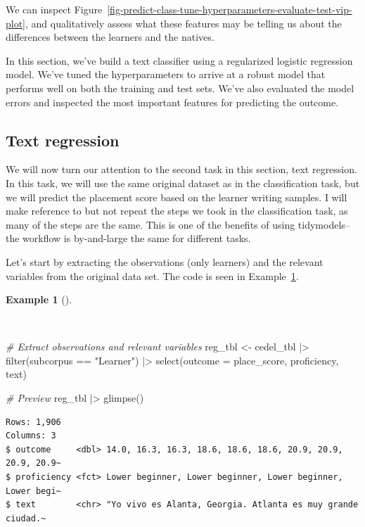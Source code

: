 \documentclass[
  letterpaper,
  krantz1]{latex/krantz-mod}
\newenvironment{Shaded}{\begin{snugshade}}{\end{snugshade}}
\newcommand{\AttributeTok}[1]{\textcolor[rgb]{0.00,0.00,0.00}{#1}}
\newcommand{\CommentTok}[1]{\textcolor[rgb]{0.00,0.00,0.00}{\textit{#1}}}
\newcommand{\FunctionTok}[1]{\textcolor[rgb]{0.00,0.00,0.00}{#1}}
\newcommand{\NormalTok}[1]{\textcolor[rgb]{0.00,0.00,0.00}{#1}}
\newcommand{\OtherTok}[1]{\textcolor[rgb]{0.00,0.00,0.00}{#1}}
\newcommand{\SpecialCharTok}[1]{\textcolor[rgb]{0.00,0.00,0.00}{#1}}
\newcommand{\StringTok}[1]{\textcolor[rgb]{0.00,0.00,0.00}{#1}}
\theoremstyle{definition}
\newtheorem{example}{Example}[chapter]
\theoremstyle{definition}
\theoremstyle{remark}
\begin{document}
We can inspect
Figure~\ref{fig-predict-class-tune-hyperparameters-evaluate-test-vip-plot},
and qualitatively assess what these features may be telling us about the
differences between the learners and the natives.

In this section, we've build a text classifier using a regularized
logistic regression model. We've tuned the hyperparameters to arrive at
a robust model that performs well on both the training and test sets.
We've also evaluated the model errors and inspected the most important
features for predicting the outcome.

\subsection{Text regression}\label{sec-predict-text-regression}

We will now turn our attention to the second task in this section, text
regression. In this task, we will use the same original dataset as in
the classification task, but we will predict the placement score based
on the learner writing samples. I will make reference to but not repeat
the steps we took in the classification task, as many of the steps are
the same. This is one of the benefits of using tidymodels--the workflow
is by-and-large the same for different tasks.

Let's start by extracting the observations (only learners) and the
relevant variables from the original data set. The code is seen in
Example~\ref{exm-predict-reg-data}.

\begin{example}[]\protect\hypertarget{exm-predict-reg-data}{}\label{exm-predict-reg-data}

~

\begin{Shaded}
\begin{Highlighting}[numbers=left,,]
\CommentTok{\# Extract observations and relevant variables}
\NormalTok{reg\_tbl }\OtherTok{\textless{}{-}}
\NormalTok{  cedel\_tbl }\SpecialCharTok{|\textgreater{}}
  \FunctionTok{filter}\NormalTok{(subcorpus }\SpecialCharTok{==} \StringTok{"Learner"}\NormalTok{) }\SpecialCharTok{|\textgreater{}}
  \FunctionTok{select}\NormalTok{(}\AttributeTok{outcome =}\NormalTok{ place\_score, proficiency, text)}

\CommentTok{\# Preview}
\NormalTok{reg\_tbl }\SpecialCharTok{|\textgreater{}} \FunctionTok{glimpse}\NormalTok{()}
\end{Highlighting}
\end{Shaded}

\begin{verbatim}
Rows: 1,906
Columns: 3
$ outcome     <dbl> 14.0, 16.3, 16.3, 18.6, 18.6, 18.6, 20.9, 20.9, 20.9, 20.9~
$ proficiency <fct> Lower beginner, Lower beginner, Lower beginner, Lower begi~
$ text        <chr> "Yo vivo es Alanta, Georgia. Atlanta es muy grande ciudad.~
\end{verbatim}

\end{example}
\end{document}
